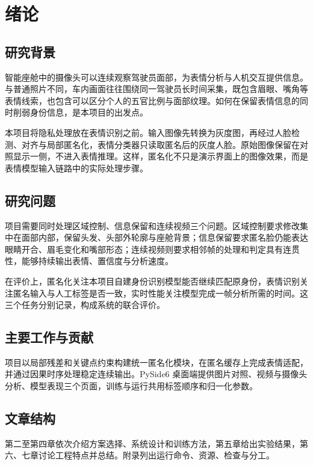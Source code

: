 \section{绪论}
\label{sec:intro}
\subsection{研究背景}
智能座舱中的摄像头可以连续观察驾驶员面部，为表情分析与人机交互提供信息。与普通照片不同，车内画面往往围绕同一驾驶员长时间采集，既包含眉眼、嘴角等表情线索，也包含可以区分个人的五官比例与面部纹理。如何在保留表情信息的同时削弱身份信息，是本项目的出发点。

本项目将隐私处理放在表情识别之前。输入图像先转换为灰度图，再经过人脸检测、对齐与局部匿名化，表情分类器只读取匿名后的灰度人脸。原始图像保留在对照显示一侧，不进入表情推理。这样，匿名化不只是演示界面上的图像效果，而是表情模型输入链路中的实际处理步骤。

\subsection{研究问题}
项目需要同时处理区域控制、信息保留和连续视频三个问题。区域控制要求修改集中在面部内部，保留头发、头部外轮廓与座舱背景；信息保留要求匿名脸仍能表达眼睛开合、眉毛变化和嘴部形态；连续视频则要求相邻帧的处理和判定具有连贯性，能够持续输出表情、置信度与分析速度。

在评价上，匿名化关注本项目自建身份识别模型能否继续匹配原身份，表情识别关注匿名输入与人工标签是否一致，实时性能关注模型完成一帧分析所需的时间。这三个任务分别记录，构成系统的联合评价。

\subsection{主要工作与贡献}
项目以局部残差和关键点约束构建统一匿名化模块，在匿名缓存上完成表情适配，并通过因果时序处理稳定连续输出。PySide6 桌面端提供图片对照、视频与摄像头分析、模型表现三个页面，训练与运行共用标签顺序和归一化参数。

\subsection{文章结构}
第二至第四章依次介绍方案选择、系统设计和训练方法，第五章给出实验结果，第六、七章讨论工程特点并总结。附录列出运行命令、资源、检查与分工。
